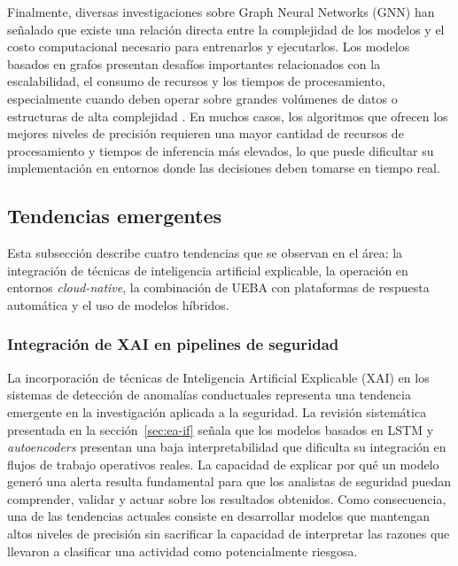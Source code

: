 Finalmente, diversas investigaciones sobre Graph Neural Networks (GNN) han señalado que existe una relación directa entre la complejidad de los modelos y el costo computacional necesario para entrenarlos y ejecutarlos. Los modelos basados en grafos presentan desafíos importantes relacionados con la escalabilidad, el consumo de recursos y los tiempos de procesamiento, especialmente cuando deben operar sobre grandes volúmenes de datos o estructuras de alta complejidad \parencite{Wu2021GNN}. En muchos casos, los algoritmos que ofrecen los mejores niveles de precisión requieren una mayor cantidad de recursos de procesamiento y tiempos de inferencia más elevados, lo que puede dificultar su implementación en entornos donde las decisiones deben tomarse en tiempo real.
\subsection{Tendencias emergentes}

Esta subsección describe cuatro tendencias que se observan en el área: la integración de técnicas de inteligencia artificial explicable, la operación en entornos \emph{cloud-native}, la combinación de UEBA con plataformas de respuesta automática y el uso de modelos híbridos.

\subsubsection{Integración de XAI en pipelines de seguridad}
La incorporación de técnicas de Inteligencia Artificial Explicable (XAI) en los sistemas de detección de anomalías conductuales representa una 
tendencia emergente en la investigación aplicada a la seguridad. La revisión sistemática presentada en la sección~\ref{sec:ea-if} \parencite{Landauer2023Survey} señala que los modelos basados en LSTM y \textit{autoencoders} presentan una baja interpretabilidad que dificulta su integración en flujos de trabajo operativos reales. La capacidad de 
explicar por qué un modelo generó una alerta resulta fundamental para que los analistas de seguridad puedan comprender, validar y actuar sobre los 
resultados obtenidos. Como consecuencia, una de las tendencias actuales consiste en desarrollar modelos que mantengan altos niveles de precisión 
sin sacrificar la capacidad de interpretar las razones que llevaron a clasificar una actividad como potencialmente riesgosa.

